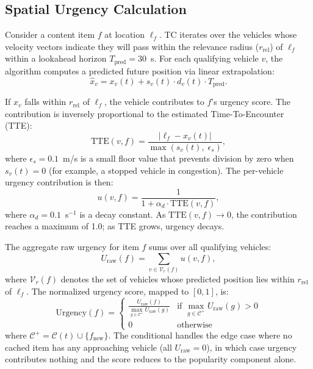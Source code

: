 \documentclass[preprint,12pt]{elsarticle}
\begin{document}
	\subsection{Spatial Urgency Calculation}
	
	Consider a content item $f$ at location $\ell_f$. TC iterates over the vehicles whose velocity vectors indicate they will pass within the relevance radius ($r_\text{rel}$) of $\ell_f$ within a lookahead horizon $T_\text{pred} = 30$~s. For each qualifying vehicle $v$, the algorithm computes a predicted future position via linear extrapolation:
	\begin{equation}
		\hat{x}_v = x_v(t) + s_v(t) \cdot d_v(t) \cdot T_\text{pred}.
		\label{eq:predict_method}
	\end{equation}
	
	If $\hat{x}_v$ falls within $r_\text{rel}$ of $\ell_f$, the vehicle contributes to $f$'s urgency score. The contribution is inversely proportional to the estimated Time-To-Encounter (TTE):
	\begin{equation}
		\text{TTE}(v, f) = \frac{|\ell_f - x_v(t)|}{\max(s_v(t),\; \epsilon_s)},
		\label{eq:tte_method}
	\end{equation}
	where $\epsilon_s = 0.1$~m/s is a small floor value that prevents division by zero when $s_v(t) = 0$ (for example, a stopped vehicle in congestion). The per-vehicle urgency contribution is then:
	\begin{equation}
		u(v, f) = \frac{1}{1 + \alpha_d \cdot \text{TTE}(v, f)},
		\label{eq:urgency_contrib_method}
	\end{equation}
	where $\alpha_d = 0.1$~s$^{-1}$ is a decay constant. As $\text{TTE}(v,f) \rightarrow 0$, the contribution reaches a maximum of 1.0; as TTE grows, urgency decays.
	
	The aggregate raw urgency for item $f$ sums over all qualifying vehicles:
	\begin{equation}
		U_\text{raw}(f) = \sum_{v \in \mathcal{V}_r(f)} u(v, f),
		\label{eq:urgency_raw_method}
	\end{equation}
	where $\mathcal{V}_r(f)$ denotes the set of vehicles whose predicted position lies within $r_\text{rel}$ of $\ell_f$. The normalized urgency score, mapped to $[0, 1]$, is:
	\begin{equation}
		\text{Urgency}(f) = \begin{cases} \frac{U_\text{raw}(f)}{\max_{g \in \mathcal{C}^+} U_\text{raw}(g)} & \text{if } \max_{g \in \mathcal{C}^+} U_\text{raw}(g) > 0 \\ 0 & \text{otherwise} \end{cases}
		\label{eq:urgency_norm_method}
	\end{equation}
	where $\mathcal{C}^+ = \mathcal{C}(t) \cup \{f_\text{new}\}$. The conditional handles the edge case where no cached item has any approaching vehicle (all $U_\text{raw} = 0$), in which case urgency contributes nothing and the score reduces to the popularity component alone.
	
\end{document}
